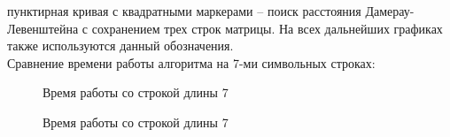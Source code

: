 \documentclass[12pt, a4paper]{article}
\begin{document}
пунктирная кривая с квадратными маркерами -- поиск 
расстояния  Дамерау-Левенштейна с 
сохранением трех строк матрицы. На всех дальнейших 
графиках также используются данный обозначения.\\
Сравнение времени работы алгоритма на 7-ми 
символьных строках: \\
\begin{figure}[h]
  \caption{Время работы со строкой длины 7}
  \label{img:algLevNRMatr, algDL3str, algLevRecNoCash}
\end{figure}
\begin{figure}[h]
  \caption{Время работы со строкой длины 7}
  \label{img:algLevNRMatr and algDL3str}
\end{figure}\\
\end{document}
